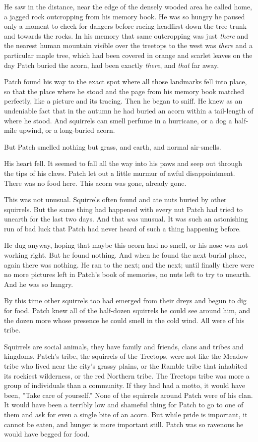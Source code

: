 \documentclass[12pt]{book}
\begin{document}
He saw in the distance, near the edge of the densely wooded area he called home, a jagged rock outcropping from his memory book. He was so hungry he paused only a moment to check for dangers before racing headfirst down the tree trunk and towards the rocks. In his memory that same outcropping was just {\it there} %
and the nearest human mountain visible over the treetops to the west was {\it there} %
and a particular maple tree, which had been covered in orange and scarlet leaves on the day Patch buried the acorn, had been exactly {\it there}, and {\it that} far away.

Patch found his way to the exact spot where all those landmarks fell into place, so that the place where he stood and the page from his memory book matched perfectly, like a picture and its tracing. Then he began to sniff. He knew as an undeniable fact that in the autumn he had buried an acorn within a tail-length of where he stood. And squirrels can smell perfume in a hurricane, or a dog a half-mile upwind, or a long-buried acorn.

But Patch smelled nothing but grass, and earth, and normal air-smells.

His heart fell. It seemed to fall all the way into his paws and seep out through the tips of his claws. Patch let out a little murmur of awful disappointment. There was no food here. This acorn was gone, already gone.

This was not unusual. Squirrels often found and ate nuts buried by other squirrels. But the same thing had happened with every nut Patch had tried to unearth for the last two days. And that {\it was} unusual. It was such an astonishing run of bad luck that Patch had never heard of such a thing happening before.

He dug anyway, hoping that maybe this acorn had no smell, or his nose was not working right. But he found nothing. And when he found the next burial place, again there was nothing. He ran to the next; and the next; until finally there were no more pictures left in Patch's book of memories, no nuts left to try to unearth. And he was so hungry.

By this time other squirrels too had emerged from their dreys and begun to dig for food. Patch knew all of the half-dozen squirrels he could see around him, and the dozen more whose presence he could smell in the cold wind. All were of his tribe.

Squirrels are social animals, they have family and friends, clans and tribes and kingdoms. Patch's tribe, the squirrels of the Treetops, were not like the Meadow tribe who lived near the city's grassy plains, or the Ramble tribe that inhabited its rockiest wilderness, or the red Northern tribe. The Treetops tribe was more a group of individuals than a community. If they had had a motto, it would have been, ''Take care of yourself.'' None of the squirrels around Patch were of his clan. It would have been a terribly low and shameful thing for Patch to go to one of them and ask for even a single bite of an acorn. But while pride is important, it cannot be eaten, and hunger is more important still. Patch was so ravenous he would have begged for food.
\end{document}
